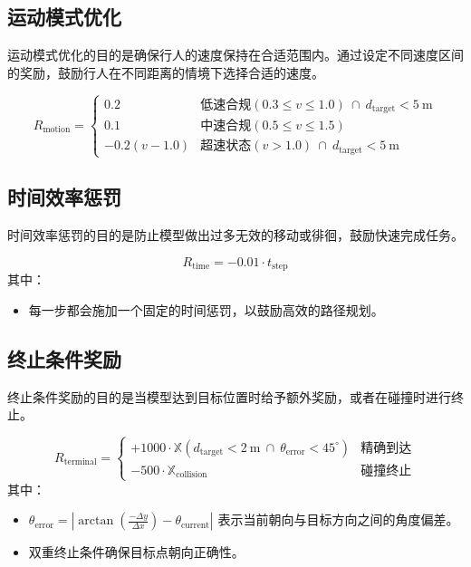 \subsection{运动模式优化}
运动模式优化的目的是确保行人的速度保持在合适范围内。通过设定不同速度区间的奖励，鼓励行人在不同距离的情境下选择合适的速度。
	
\begin{equation}
R_{\text{motion}} =
\begin{cases}
0.2 & \text{低速合规}(0.3 \leq v \leq 1.0)\ \cap\ d_{\text{target}} < 5\ \text{m} \\
0.1 & \text{中速合规}(0.5 \leq v \leq 1.5) \\
-0.2(v-1.0) & \text{超速状态}(v > 1.0)\ \cap\ d_{\text{target}} < 5\ \text{m}
\end{cases}
\end{equation}
	
\subsection{时间效率惩罚}
时间效率惩罚的目的是防止模型做出过多无效的移动或徘徊，鼓励快速完成任务。
	
\begin{equation}
R_{\text{time}} = -0.01 \cdot t_{\text{step}}
\end{equation}
其中：
\begin{itemize}
	\item 每一步都会施加一个固定的时间惩罚，以鼓励高效的路径规划。
\end{itemize}
	
\subsection{终止条件奖励}
终止条件奖励的目的是当模型达到目标位置时给予额外奖励，或者在碰撞时进行终止。
	
\begin{equation}
R_{\text{terminal}} =
\begin{cases}
+1000 \cdot \mathbb{X}(d_{\text{target}} < 2\ \text{m}\ \cap\ \theta_{\text{error}} < 45^\circ) & \text{精确到达} \\
-500 \cdot \mathbb{X}_{\text{collision}} & \text{碰撞终止}
\end{cases}
\end{equation}
其中：
\begin{itemize}
	\item \( \theta_{\text{error}} = \left| \arctan\left(\frac{-\Delta y}{\Delta x}\right) - \theta_{\text{current}} \right| \) 表示当前朝向与目标方向之间的角度偏差。
	\item 双重终止条件确保目标点朝向正确性。
\end{itemize}
	
